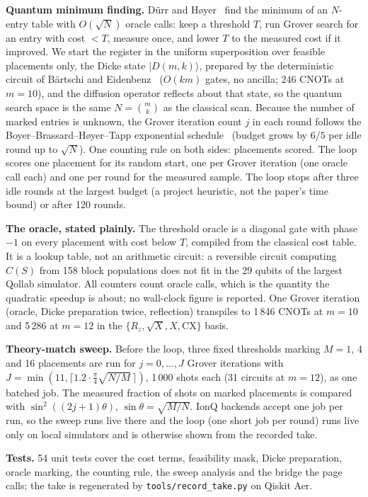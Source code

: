 \documentclass[10pt,twocolumn]{article}
\begin{document}
\textbf{Quantum minimum finding.} D\"urr and H{\o}yer~\cite{dh} find the minimum of an $N$-entry table with $O(\sqrt N)$ oracle calls: keep a threshold $T$, run Grover search for an entry with cost $<T$, measure once, and lower $T$ to the measured cost if it improved. We start the register in the uniform superposition over feasible placements only, the Dicke state $|D(m,k)\rangle$, prepared by the deterministic circuit of B\"artschi and Eidenbenz~\cite{dicke} ($O(km)$ gates, no ancilla; 246 CNOTs at $m=10$), and the diffusion operator reflects about that state, so the quantum search space is the same $N=\binom{m}{k}$ as the classical scan. Because the number of marked entries is unknown, the Grover iteration count $j$ in each round follows the Boyer--Brassard--H{\o}yer--Tapp exponential schedule~\cite{bbht} (budget grows by $6/5$ per idle round up to $\sqrt N$). One counting rule on both sides: placements scored. The loop scores one placement for its random start, one per Grover iteration (one oracle call each) and one per round for the measured sample. The loop stops after three idle rounds at the largest budget (a project heuristic, not the paper's time bound) or after 120 rounds.

\textbf{The oracle, stated plainly.} The threshold oracle is a diagonal gate with phase $-1$ on every placement with cost below $T$, compiled from the classical cost table. It is a lookup table, not an arithmetic circuit: a reversible circuit computing $C(S)$ from 158 block populations does not fit in the 29 qubits of the largest Qollab simulator. All counters count oracle calls, which is the quantity the quadratic speedup is about; no wall-clock figure is reported. One Grover iteration (oracle, Dicke preparation twice, reflection) transpiles to 1\,846 CNOTs at $m=10$ and 5\,286 at $m=12$ in the $\{R_z, \sqrt X, X, \mathrm{CX}\}$ basis.

\textbf{Theory-match sweep.} Before the loop, three fixed thresholds marking $M=1$, 4 and 16 placements are run for $j=0,\dots,J$ Grover iterations with $J=\min(11,\lceil 1.2\cdot\tfrac{\pi}{4}\sqrt{N/M}\,\rceil)$, 1\,000 shots each (31 circuits at $m=12$), as one batched job. The measured fraction of shots on marked placements is compared with $\sin^2((2j+1)\theta)$, $\sin\theta=\sqrt{M/N}$. IonQ backends accept one job per run, so the sweep runs live there and the loop (one short job per round) runs live only on local simulators and is otherwise shown from the recorded take.

\textbf{Tests.} 54 unit tests cover the cost terms, feasibility mask, Dicke preparation, oracle marking, the counting rule, the sweep analysis and the bridge the page calls; the take is regenerated by \texttt{tools/record\_take.py} on Qiskit Aer.
\end{document}
